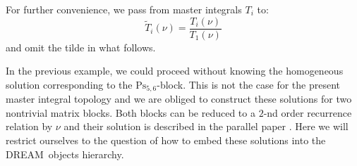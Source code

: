 \documentclass[sort&compress]{elsarticle}
\begin{document}
For further convenience, we pass from master integrals $T_i$ to:
\begin{equation}
	\widetilde{T}_i(\nu) = \frac{ T_i(\nu) }{ T_1(\nu) }
\end{equation}
and omit the tilde in what follows.

In the previous example, we could proceed without knowing the homogeneous solution corresponding to the $\mathrm{Ps}_{5,6}$-block.
This is not the case for the present master integral topology and we are obliged to construct these solutions for two nontrivial matrix blocks.
Both blocks can be reduced to a $2$-nd order recurrence relation by $\nu$
and their solution is described in the parallel paper \cite{LeeMingulov:Meromorphic}.
Here we will restrict ourselves to the question of how to embed these solutions into the DREAM\ objects hierarchy.
\end{document}

